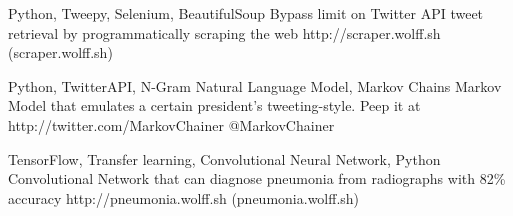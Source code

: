 \documentclass[10pt, letterpaper]{awesome-cv}
\begin{document}
\vspace*{-1ex}
\vspace*{-2ex}
\begin{projects}
        
    {Python, Tweepy, Selenium, BeautifulSoup}
    {Bypass limit on Twitter API tweet retrieval by programmatically scraping the web}
    {http://scraper.wolff.sh}
    {(scraper.wolff.sh)}
    
    
    {Python, TwitterAPI, N-Gram Natural Language Model, Markov Chains}
    {Markov Model that emulates a certain president's tweeting-style. Peep it at}
    {http://twitter.com/MarkovChainer}
    {@MarkovChainer}
    
    {TensorFlow, Transfer learning, Convolutional Neural Network, Python}
    {Convolutional Network that can diagnose pneumonia from radiographs with 82\% accuracy}
    {http://pneumonia.wolff.sh}
    {(pneumonia.wolff.sh)}
    
    
\end{projects}
\end{document}
